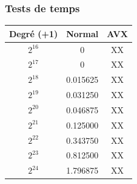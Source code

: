 \documentclass[12pt, a4paper]{article}
\begin{document}
\subsubsection{Tests de temps}
\begin{center}
\begin{tabular}{||c c c||}
\hline
Degré (+1) & Normal & AVX \\
\hline\hline
$2^{16}$ & 0 & XX \\
\hline
$2^{17}$ & 0 & XX \\
\hline
$2^{18}$ & 0.015625 & XX \\
\hline
$2^{19}$ & 0.031250 & XX \\
\hline
$2^{20}$ & 0.046875 & XX \\
\hline
$2^{21}$ & 0.125000 & XX \\
\hline
$2^{22}$ & 0.343750 & XX \\
\hline
$2^{23}$ & 0.812500 & XX \\
\hline
$2^{24}$ & 1.796875 & XX \\
\hline
\end{tabular}
\end{center}
\end{document}
